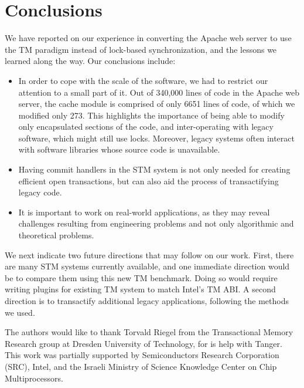 \documentclass[preprint,11pt]{sigplanconf}
\begin{document}
\section{Conclusions}\label{sec:conclusions}

We have reported on our experience in converting the Apache web 
server to use the TM paradigm instead of lock-based synchronization,
and the lessons we learned along the way. Our conclusions include:

\begin{itemize}

\item
In order to cope with the scale of the software, we had to restrict
our attention to a small part of it. 
Out of 340,000 lines of code in the Apache web server, the cache module
is comprised of only 6651 lines of code, of which we modified only 273. 
This highlights the importance of being able to modify only
encapsulated sections of the code, and inter-operating with legacy software,
which might still use locks.  Moreover, legacy systems often interact
with software libraries whose source code is unavailable. 

  \item Having commit handlers in the STM system is not only needed for creating
efficient open transactions, but can also aid the process of transactifying
legacy code.

  \item It is important to work on real-world applications, as they
may reveal challenges resulting from engineering problems and not only
algorithmic and theoretical problems.

\end{itemize}

We next indicate two future directions that may follow on our work. 
First, there are many STM systems currently available, and one immediate direction
would be to compare them using this new TM benchmark. Doing so would require writing
plugins for existing TM system to match Intel's TM ABI. 
A second direction is to transactify additional 
legacy applications, following the methods we used.



\acks

The authors would like to thank Torvald Riegel from the Transactional Memory Research
group at Dresden University of Technology, for is help with {\sc Tanger}. 
This work was partially supported by Semiconductors Research
Corporation (SRC), Intel, and the Israeli Ministry of Science
Knowledge Center on Chip Multiprocessors.



%
%


\end{document}
